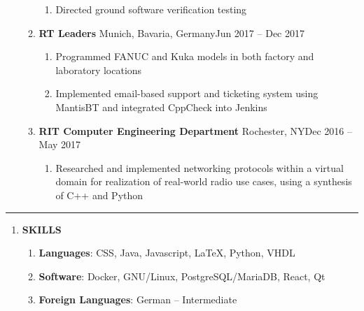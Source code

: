 \documentclass[11pt]{article}
\begin{document}
\begin{center}
\begin{enumerate}[label={}, leftmargin=0pt, parsep=5pt]
\begin{enumerate}[label={}, itemsep=5pt]
\begin{enumerate}[label={--}]
            \item Directed ground software verification testing
        \end{enumerate}
        \item \textbf{RT Leaders} \textbar{} Munich, Bavaria, Germany\hfill Jun 2017 -- Dec 2017
        \begin{enumerate}[label={--}]
            \item Programmed FANUC and Kuka models in both factory and laboratory locations
            \item Implemented email-based support and ticketing system using MantisBT and integrated CppCheck into Jenkins
        \end{enumerate}
        \item \textbf{RIT Computer Engineering Department} \textbar{} Rochester, NY\hfill Dec 2016 -- May 2017
        \begin{enumerate}[label={--}]
            \item Researched and implemented networking protocols within a virtual domain for realization of real-world radio use cases, using a synthesis of C++ and Python
        \end{enumerate}
    \end{enumerate}
\end{enumerate}
\end{center}
\textcolor{black!20}{\rule{\textwidth}{3pt}}
\begin{center}
\begin{enumerate}[label={}, leftmargin=0pt, parsep=5pt]
    \item {\Large \textbf{SKILLS}}
    \begin{enumerate}[label={}, itemsep=5pt]
        \item \textbf{Languages}: CSS, Java, Javascript, \LaTeX, Python, VHDL
        \item \textbf{Software}: Docker, GNU/Linux, PostgreSQL/MariaDB, React, Qt
        \item \textbf{Foreign Languages}: German -- Intermediate
    \end{enumerate}
\end{enumerate}
\end{center}
\end{document}
